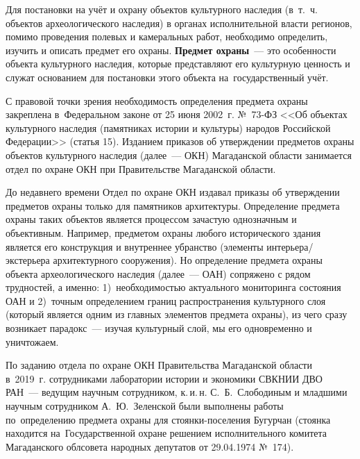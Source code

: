  

\makeProcTitleRazdel
{}

Для постановки на учёт и охрану объектов культурного наследия (в~т.~ч. объектов археологического наследия) в органах исполнительной власти регионов, помимо проведения полевых и камеральных работ, необходимо определить, изучить и описать предмет его охраны. \textbf{Предмет охраны}~--- это особенности объекта культурного наследия, которые представляют его культурную ценность и служат основанием для постановки этого объекта на~государственный учёт.

С правовой точки зрения необходимость определения предмета охраны закреплена в~Федеральном законе от 25 июня 2002~г. №~73-ФЗ <<Об объектах культурного наследия (памятниках истории и культуры) народов Российской Федерации>> (статья 15). Изданием приказов об утверждении предметов охраны объектов культурного наследия (далее~--- ОКН) Магаданской области занимается отдел по охране ОКН при Правительстве Магаданской области.

До недавнего времени Отдел по охране ОКН издавал приказы об утверждении предметов охраны только для памятников архитектуры. Определение предмета охраны таких объектов является процессом зачастую однозначным и объективным. Например, предметом охраны любого исторического здания является его конструкция и внутреннее убранство (элементы интерьера/экстерьера архитектурного сооружения). Но определение предмета охраны объекта археологического наследия (далее~--- ОАН) сопряжено с рядом трудностей, а именно: 1)~необходимостью актуального мониторинга состояния ОАН и 2)~точным определением границ распространения культурного слоя (который является одним из главных элементов предмета охраны), из чего сразу возникает парадокс~--- изучая культурный слой, мы его одновременно и уничтожаем.

 По заданию отдела по охране ОКН Правительства Магаданской области в~2019~г. сотрудниками лаборатории истории и экономики СВКНИИ ДВО РАН~--- ведущим научным сотрудником, к.\,и.\,н. С.~Б.~Слободиным и младшими научным сотрудником А.~Ю.~Зеленской были выполнены работы по~определению предмета охраны для стоянки-поселения Бугурчан (стоянка находится на~Государственной охране решением исполнительного комитета Магаданского облсовета народных депутатов от 29.04.1974 №~174).

